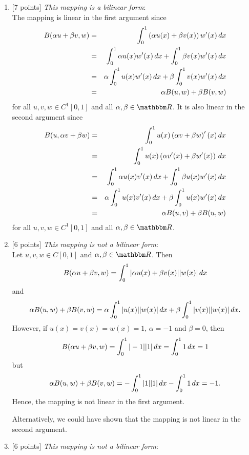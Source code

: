 \begin{solution}
\begin{enumerate}
\item {[7 points]} \emph{This mapping is a bilinear form}:\\

The mapping is linear in the first argument since
\begin{eqnarray*}
B(\alpha u + \beta v, w)&=& \int_0^1 \left(\alpha u(x) + \beta v(x)\right) w'(x)\,dx
\\
&=&  \int_0^1\alpha u(x) w'(x) \,dx + \int_0^1\beta v(x) w'(x)\,dx
\\
&=& \alpha \int_0^1 u(x) w'(x) \,dx + \beta\int_0^1 v(x) w'(x)\,dx
\\
&=& \alpha B(u,w) + \beta B(v,w)
\end{eqnarray*}
for all $u,v,w\in C^1[0,1]$ and all $\alpha,\beta\in\R$. It is also linear in the second argument since
\begin{eqnarray*}
B(u,\alpha v+\beta w)&=& \int_0^1 u(x) \left(\alpha v + \beta w\right)'(x)\,dx
\\
&=& \int_0^1 u(x) \left(\alpha v'(x) + \beta w'(x)\right)\,dx
\\
&=&  \int_0^1\alpha u(x) v'(x) \,dx + \int_0^1\beta u(x) w'(x)\,dx
\\
&=& \alpha \int_0^1 u(x) v'(x) \,dx + \beta\int_0^1 u(x) w'(x)\,dx
\\
&=& \alpha B(u,v) + \beta B(u,w)
\end{eqnarray*}
for all $u,v,w\in C^1[0,1]$ and all $\alpha,\beta\in\R$.

\item {[6 points]} \emph{This mapping is not a bilinear form}:\\

Let $u,v,w\in C[0,1]$ and $\alpha,\beta\in\R$. Then
\[ B(\alpha u+\beta v,w) = \int_0^1 |\alpha u(x)+\beta v(x)| |w(x)|\, d x\]
and
\[ \alpha B(u,w) + \beta B(v,w) = \alpha\int_0^1 |u(x)| |w(x)|\, d x+\beta\int_0^1 |v(x)| |w(x)|\, d x.\]
However, if $u(x)=v(x)=w(x)=1$, $\alpha=-1$ and $\beta=0$, then
\[ B(\alpha u+\beta v,w) = \int_0^1 |-1| |1|\, d x=\int_0^1 1\, d x=1\]
but
\[ \alpha B(u,w) + \beta B(v,w) = -\int_0^1 |1| |1|\, d x -\int_0^1 1\, d x=-1.\]
Hence, the mapping is not linear in the first argument.

Alternatively, we could have shown that the mapping is not linear in the second argument.

\item {[6 points]} \emph{This mapping is not a bilinear form}:\\


\end{enumerate}
\end{solution}
